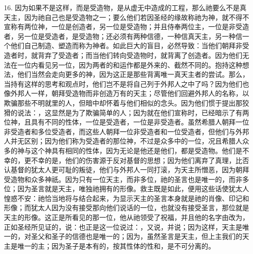 16. 因为如果不是这样，而是受造物，是从虚无中造成的工程，那么祂要么不是真天主，因为祂自己也是受造物之一；要么他们若因圣经的缘故称祂为神，就不得不宣称有两位神，一位是创造者，另一位是受造物；并且侍奉两位主，一位是非受造者，另一位是受造者，是受造物；还必须有两种信德，一种信真天主，另一种信一个他们自己制造、塑造而称为神者。如此巨大的盲目，必然导致：当他们朝拜非受造者时，就背弃了受造者；而当他们转向受造物时，就背离了创造者。因为他们无法在一位内看见另一位，因为两者的和运作都是外来的、截然不同的。抱持这种想法，他们当然会走向更多的神，因为这正是那些背离唯一真天主者的尝试。那么，当持有这样的思考和观点时，他们岂不是将自己列于外邦人之中了吗？因为他们也像外邦人一样，朝拜受造物而非创造万有的天主；尽管他们回避外邦人的名称，以欺骗那些不明就里的人，但暗中却怀着与他们相似的念头。因为他们惯于提出那狡猾的说法：，这显然是为了欺骗简单的人；因为就在他们宣称时，已经暗示了有两位神，且具有不同的性体，一位是受造者，一位是非受造者。虽然希腊人朝拜一位非受造者和多位受造者，而这些人朝拜一位非受造者和一位受造者，但他们与外邦人并无区别；因为他们称为受造者的那位神，不过是众多中的一位，况且希腊人众多的神与这个神具有相同的性体，因为无论是他还是他们，都是受造物。他们是不幸的，更不幸的是，他们的伤害源于反对基督的思想；因为他们离弃了真理，比否认基督的犹太人更可耻的叛徒，他们与外邦人一同打滚，为天主所憎恶，因为朝拜受造物和众多神祇。因为只有一位天主，而非多位，祂的圣言也是唯一的，而非多位；因为圣言就是天主，唯独祂拥有的形像。救主既是如此，便用这些话使犹太人惶惑不安：祂恰当地将与结合起来，为显示天主的圣言本身就是祂的肖像、印记和形像；而犹太人因为没有接受那向他们说话的一位，也就没有接受圣言，那位就是天主的形像。这正是所看见的那一位，他从祂领受了祝福，并且他的名字由改为，正如圣经所见证的，说：也正是这一位说过：，又说，并说；因为这样，天主是唯一的，对圣父和圣子的信德也是唯一的；因为，虽然圣言是天主，但上主我们的天主是唯一的主；因为圣子是本有的，按其性体的性和，是不可分离的。\par

